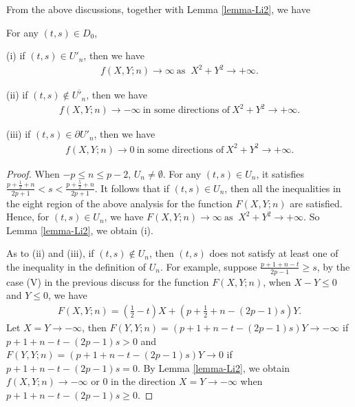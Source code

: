 \documentclass[12pt]{amsart}
\begin{document}
From the above discussions, together with Lemma \ref{lemma-Li2}, we have
\begin{lemma} 
For any $(t,s)\in D_0$, 

(i) if $(t,s)\in U'_n$, then we have 
\begin{align}
    f(X,Y;n)\rightarrow \infty \ \text{as } \ X^2+Y^2\rightarrow +\infty.
\end{align}

(ii) if $(t,s)\notin \overline{U'_n}$, then we have 
\begin{align}
    f(X,Y;n)\rightarrow -\infty \ \text{in some directions of} \  X^2+Y^2\rightarrow +\infty.
\end{align}

(iii) if $(t,s)\in \partial{U'_n}$, then we have 
\begin{align}
    f(X,Y;n)\rightarrow 0 \  \text{in some directions of} \  X^2+Y^2\rightarrow +\infty.
\end{align}
\end{lemma}
\begin{proof}
When $-p\leq n\leq p-2$, $U_n\neq \emptyset$.  For any $(t,s)\in U_n$, it satisfies $\frac{p+\frac{1}{2}+n}{2p+1}<s<\frac{p+\frac{5}{2}+n}{2p+1}$. It follows that if $(t,s)\in U_n$, then all the inequalities in the eight region of the above analysis for the function $F(X,Y;n)$ 
are satisfied. Hence, for $(t,s)\in U_n$, we have $F(X,Y;n)\rightarrow \infty \ \text{as } \ X^2+Y^2\rightarrow +\infty.$ So Lemma \ref{lemma-Li2}, we obtain (i).  

As to (ii) and (iii), if $(t,s)\notin U_n$, then $(t,s)$ does not satisfy at least one of the inequality in the definition of $U_n$.  For example, suppose $\frac{p+1+n-t}{2p-1}\geq s$, by the case (V) in the previous discuss for the function $F(X,Y;n)$, when $X-Y\leq 0$ and $Y\leq 0$, we have 
\begin{align}
    F(X,Y;n)=\left(\frac{1}{2}-t\right)X+\left(p+\frac{1}{2}+n-(2p-1)s\right)Y.
\end{align}
Let $X=Y\rightarrow -\infty$, then $F(Y,Y;n)=(p+1+n-t-(2p-1)s)Y\rightarrow -\infty$ if $p+1+n-t-(2p-1)s>0$ and 
$F(Y,Y;n)=(p+1+n-t-(2p-1)s)Y\rightarrow 0$ if $p+1+n-t-(2p-1)s=0$. By Lemma \ref{lemma-Li2}, we obtain $f(X,Y;n)\rightarrow -\infty$ or $0$ in the direction $X=Y\rightarrow -\infty$ when $p+1+n-t-(2p-1)s\geq 0$. 
\end{proof}
\end{document}
